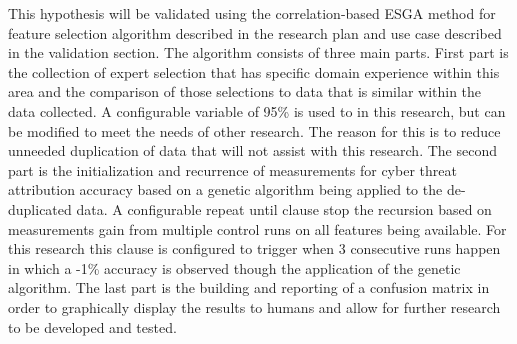 \documentclass[12pt]{report}
\begin{document}
This hypothesis will be validated using the correlation-based ESGA method for feature selection algorithm described in the research plan and use case described in the validation section.  The algorithm consists of three main parts.  First part is the collection of expert selection that has specific domain experience within this area and the comparison of those selections to data that is similar within the data collected.  A configurable variable of 95\% is used to in this research, but can be modified to meet the needs of other research.  The reason for this is to reduce unneeded duplication of data that will not assist with this research.  The second part is the initialization and recurrence of measurements for cyber threat attribution accuracy based on a genetic algorithm being applied to the de-duplicated data.  A configurable repeat until clause stop the recursion based on measurements gain from multiple control runs on all features being available.  For this research this clause is configured to trigger when 3 consecutive runs happen in which a -1\% accuracy is observed though the application of the genetic algorithm.  The last part is the building and reporting of a confusion matrix in order to graphically display the results to humans and allow for further research to be developed and tested.

\end{document}
